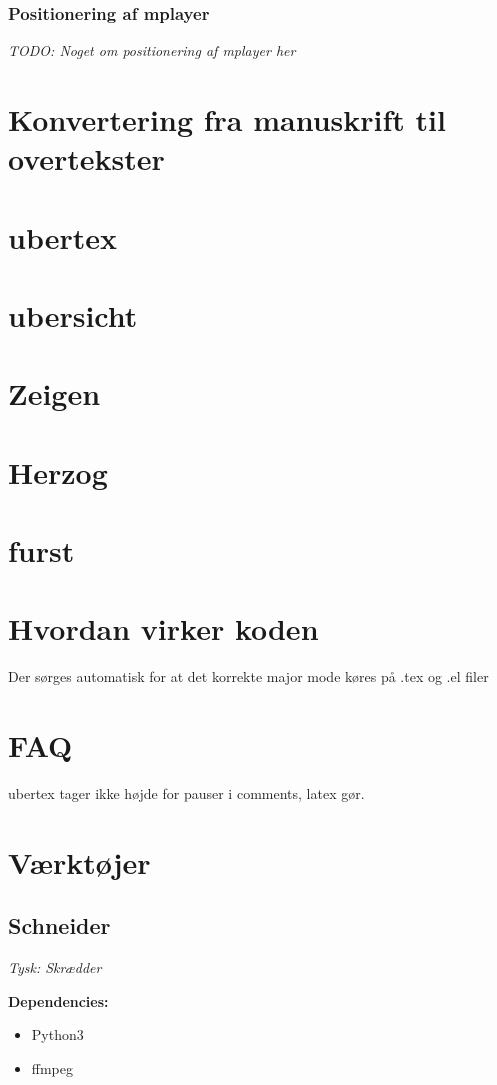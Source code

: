 \documentclass[10pt,a4paper,danish]{article}
\begin{document}
\subsubsection{Positionering af mplayer}
\textit{TODO: Noget om positionering af mplayer her}

\section{Konvertering fra manuskrift til overtekster}
\section{ubertex}
\section{ubersicht}
\section{Zeigen}
\section{Herzog}

\section{furst}
\section{Hvordan virker koden}

Der sørges automatisk for at det korrekte major mode køres på .tex og .el filer
\section{FAQ}
ubertex tager ikke højde for pauser i comments, latex gør.

\section{Værktøjer}
\subsection{Schneider}
\textit{Tysk: Skrædder}

\textbf{Dependencies:}
\begin{itemize}
\item Python3
\item ffmpeg
\end{itemize}
\end{document}
